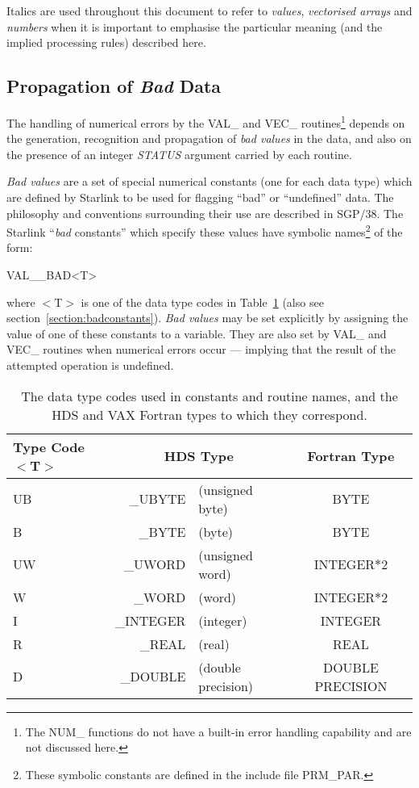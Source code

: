 \documentclass[11pt,nolof]{starlink}
\providecommand{\name}[1]{#1}
\providecommand{\fortvar}[1]{\emph{#1}}
\begin{document}
Italics are used throughout this document to refer to \emph{values}, \emph{vectorised arrays} and \emph{numbers} when it is important to emphasise the
particular meaning (and the implied processing rules) described here.

\subsection{Propagation of \emph{Bad} Data}
\label{section:bad}

The handling of numerical errors by the \name{VAL\_} and \name{VEC\_}
routines\footnote{The \name{NUM\_} functions do not have a built-in error
handling capability and are not discussed here.}  depends on the generation,
recognition and propagation of \emph{bad values} in the data, and also on
the presence of an integer \fortvar{STATUS} argument carried by each
routine.

\emph{Bad values} are a set of special numerical constants (one for each data
type) which are defined by Starlink to be used for flagging ``bad'' or
``undefined'' data.
The philosophy and conventions surrounding their use are described in SGP/38.
The Starlink ``\emph{bad} constants'' which specify these values have
symbolic names\footnote{
These symbolic constants are defined in the include file \name{PRM\_PAR}.}
of the form:

\begin{terminalv}
VAL__BAD<T>
\end{terminalv}

where \name{$<$T$>$} is one of the data type codes in
Table~\ref{table:types} (also see section~\ref{section:badconstants}).
\emph{Bad values} may be set explicitly by assigning the value of one of
these constants to a variable.
They are also set by \name{VAL\_} and \name{VEC\_} routines when numerical
errors occur --- implying that the result of the attempted operation is
undefined.

\begin{table}
\begin{center}
\begin{tabular}{|l|rl|c|}
\hline
\textbf{Type Code $<$T$>$} &
\multicolumn{2}{|c|}{\textbf{HDS Type}} & \textbf{Fortran Type } \\
\hline
UB & \_UBYTE & (unsigned byte) & BYTE \\
B & \_BYTE & (byte) & BYTE \\
UW & \_UWORD & (unsigned word) & INTEGER$*$2 \\
W & \_WORD & (word) & INTEGER$*$2 \\
I & \_INTEGER & (integer) & INTEGER \\
R & \_REAL & (real) & REAL \\
D & \_DOUBLE & (double precision) & DOUBLE PRECISION \\
\hline
\end{tabular}
\caption{The data type codes used in constants and routine names, and the
\name{HDS} and \name{VAX} Fortran types to which they correspond.}
\label{table:types}
\end{center}
\end{table}
\end{document}
